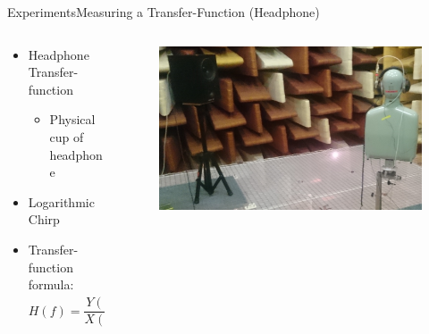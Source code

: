 \begin{frame}{Experiments}{Measuring a Transfer-Function (Headphone)}		
	\begin{columns}
		\begin{column}{0.5\textwidth}
			\begin{itemize}
				\item Headphone Transfer-function
				\begin{itemize}
					\item Physical cup of headphone
				\end{itemize}
				\item{Logarithmic Chirp}
				\item Transfer-function formula:
					\begin{equation*}
						H(f)=\frac{Y(f)}{X(f)}=\frac{\mathscr{F}(y(t))\times\mathscr{F}^{\ast}(x(t))}{\mathscr{F}(x(t))\times\mathscr{F}^{\ast}(x(t))}
					\end{equation*}
			\end{itemize}
		\end{column}
		\begin{column}{0.5\textwidth} 
			\begin{figure}[h]
				\includegraphics[width=1\textwidth]{figures/TransferFunctionHP}
			\end{figure}
		\end{column}
	\end{columns}
\end{frame}

